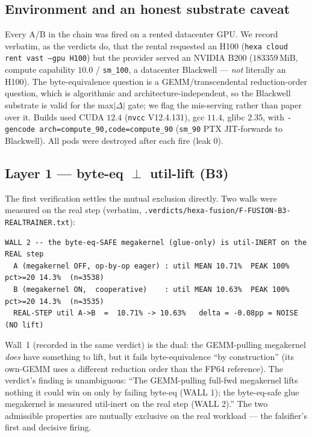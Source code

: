 \documentclass[11pt,a4paper]{article}
\newcommand{\verdict}[1]{\texttt{.verdicts/hexa-fusion/#1}}
\begin{document}
\subsection{Environment and an honest substrate caveat}
\label{sec:env}

Every A/B in the chain was fired on a rented datacenter GPU. We record
verbatim, as the verdicts do, that the rental requested an
H100 (\texttt{hexa cloud rent vast --gpu H100}) but the provider served an
NVIDIA B200 ($183359$\,MiB, compute capability $10.0$ / \texttt{sm\_100}, a
datacenter Blackwell --- \emph{not} literally an H100). The byte-equivalence
question is a GEMM/transcendental reduction-order question, which is
algorithmic and architecture-independent, so the Blackwell substrate is
valid for the max$|\Delta|$ gate; we flag the mis-serving rather than paper
over it. Builds used CUDA $12.4$ (\texttt{nvcc} V12.4.131), gcc $11.4$,
glibc $2.35$, with \texttt{-gencode arch=compute\_90,code=compute\_90}
(\texttt{sm\_90} PTX JIT-forwards to Blackwell). All pods were destroyed
after each fire (leak $0$).

\subsection{Layer 1 --- byte-eq $\perp$ util-lift (B3)}
\label{sec:mutex}

The first verification settles the mutual exclusion directly. Two walls were
measured on the real step (verbatim, \verdict{F-FUSION-B3-REALTRAINER.txt}):

\begin{lstlisting}
WALL 2 -- the byte-eq-SAFE megakernel (glue-only) is util-INERT on the REAL step
  A (megakernel OFF, op-by-op eager) : util MEAN 10.71%  PEAK 100%  pct>=20 14.3%  (n=3538)
  B (megakernel ON,  cooperative)    : util MEAN 10.63%  PEAK 100%  pct>=20 14.3%  (n=3535)
  REAL-STEP util A->B  =  10.71% -> 10.63%   delta = -0.08pp = NOISE   (NO lift)
\end{lstlisting}

\noindent Wall~1 (recorded in the same verdict) is the dual: the GEMM-pulling
megakernel \emph{does} have something to lift, but it fails byte-equivalence
``by construction'' (its own-GEMM uses a different reduction order than the
FP64 reference). The verdict's finding is unambiguous: ``The GEMM-pulling
full-fwd megakernel lifts nothing it could win on only by failing byte-eq
(WALL 1); the byte-eq-safe glue megakernel is measured util-inert on the
real step (WALL 2).'' The two admissible properties are mutually exclusive
on the real workload --- the falsifier's first and decisive firing.
\end{document}
